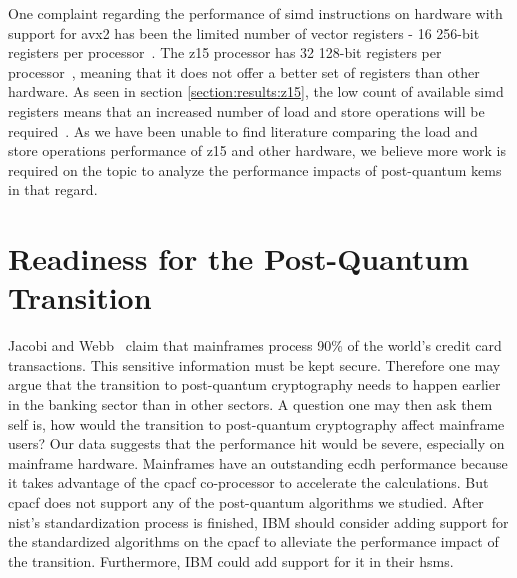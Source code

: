 One complaint regarding the performance of \gls{simd} instructions on hardware with support for \gls{avx2} has been the limited number of vector registers - 16 256-bit registers per processor~\cite{guneysu2013}. The \gls{z15} processor has 32 128-bit registers per processor~\cite{redbook:z15}, meaning that it does not offer a better set of registers than other hardware. As seen in section \ref{section:results:z15}, the low count of available \gls{simd} registers means that an increased number of load and store operations will be required~\cite{guneysu2013}. As we have been unable to find literature comparing the load and store operations performance of \gls{z15} and other hardware, we believe more work is required on the topic to analyze the performance impacts of \gls{post-quantum} \glspl{kem} in that regard.


\section{Readiness for the Post-Quantum Transition}
\label{section:discussion:post-quantum-transition-readiness}


Jacobi and Webb~\cite{jacobi2020} claim that mainframes process 90\% of the world's credit card transactions. This sensitive information must be kept secure. Therefore one may argue that the transition to post-quantum cryptography needs to happen earlier in the banking sector than in other sectors. A question one may then ask them self is, how would the transition to post-quantum cryptography affect mainframe users? Our data suggests that the performance hit would be severe, especially on mainframe hardware. Mainframes have an outstanding \gls{ecdh} performance because it takes advantage of the \gls{cpacf} co-processor to accelerate the calculations. But \gls{cpacf} does not support any of the post-quantum algorithms we studied. After \gls{nist}'s standardization process is finished, IBM should consider adding support for the standardized algorithms on the \gls{cpacf} to alleviate the performance impact of the transition. Furthermore, IBM could add support for it in their \glspl{hsm}.

